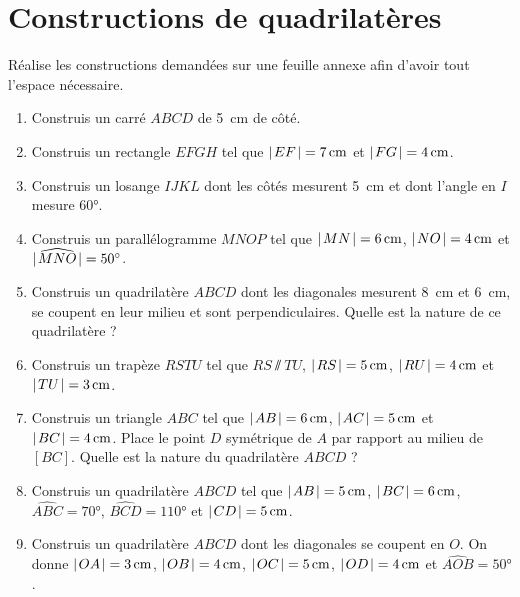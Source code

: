 \documentclass[../../syllabus_1.tex]{subfiles}
\begin{document}
\section{Constructions de quadrilatères}
Réalise les constructions demandées sur une feuille annexe afin d'avoir tout
l'espace nécessaire.
\begin{enumerate}[itemsep=1em]
    \item Construis un carré $ABCD$ de \qty{5}{cm} de côté.
    
    \item Construis un rectangle $EFGH$ tel que $\lvert\mkern2muEF\mkern2mu\rvert = \qty{7}{cm}$ et $\lvert\mkern2muFG\mkern2mu\rvert = \qty{4}{cm}$.
    
    \item Construis un losange $IJKL$ dont les côtés mesurent \qty{5}{cm} et dont l'angle en $I$ mesure \ang{60}.
    
    \item Construis un parallélogramme $MNOP$ tel que $\lvert\mkern2muMN\mkern2mu\rvert = \qty{6}{cm}$, $\lvert\mkern2muNO\mkern2mu\rvert = \qty{4}{cm}$ et \\$\lvert\mkern2mu\widehat{MNO}\mkern2mu\rvert = \ang{50}$.
    
    \item Construis un quadrilatère $ABCD$ dont les diagonales mesurent \qty{8}{cm} et \qty{6}{cm}, se coupent en leur milieu et sont perpendiculaires. Quelle est la nature de ce quadrilatère ?
    
    \item Construis un trapèze $RSTU$ tel que $RS \varparallel TU$,
    $\lvert\mkern2muRS\mkern2mu\rvert = \qty{5}{cm}$, $\lvert\mkern2muRU\mkern2mu\rvert = \qty{4}{cm}$ et
    $\lvert\mkern2muTU\mkern2mu\rvert = \qty{3}{cm}$.
    
    \item Construis un triangle $ABC$ tel que $\lvert\mkern2muAB\mkern2mu\rvert = \qty{6}{cm}$, $\lvert\mkern2muAC\mkern2mu\rvert = \qty{5}{cm}$ et $\lvert\mkern2muBC\mkern2mu\rvert = \qty{4}{cm}$. Place le point $D$ symétrique de $A$ par rapport au milieu de $[BC]$. Quelle est la nature du quadrilatère $ABCD$ ?
    
    \item Construis un quadrilatère $ABCD$ tel que $\lvert\mkern2muAB\mkern2mu\rvert = \qty{5}{cm}$, $\lvert\mkern2muBC\mkern2mu\rvert = \qty{6}{cm}$, $\widehat{ABC} = \ang{70}$, $\widehat{BCD} = \ang{110}$ et $\lvert\mkern2muCD\mkern2mu\rvert = \qty{5}{cm}$.
    
    \item Construis un quadrilatère $ABCD$ dont les diagonales se coupent en $O$. On donne $\lvert\mkern2muOA\mkern2mu\rvert = \qty{3}{cm}$, $\lvert\mkern2muOB\mkern2mu\rvert = \qty{4}{cm}$, $\lvert\mkern2muOC\mkern2mu\rvert = \qty{5}{cm}$, $\lvert\mkern2muOD\mkern2mu\rvert = \qty{4}{cm}$ et $\widehat{AOB} = \ang{50}$.
    

\end{enumerate}
\end{document}
